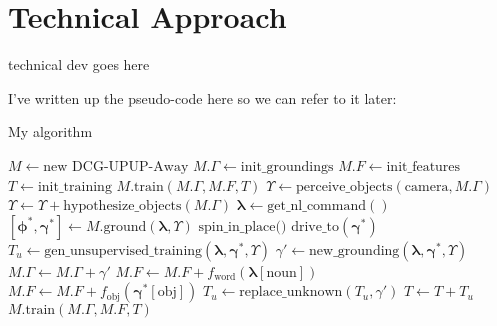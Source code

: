 \section{Technical Approach} \label{sec:technical}
technical dev goes here

I've written up the pseudo-code here so we can refer to it later:\\
\begin{algorithm}
\caption{My algorithm}\label{alg:dcg_upup_away}
\begin{algorithmic}[1]
\State $M \gets \text{new DCG-UPUP-Away}$
\State $M.\Gamma \gets \text{init\_groundings}$
\State $M.F \gets \text{init\_features}$
\State $T \gets \text{init\_training}$
\State $M.\text{train}(M.\Gamma, M.F, T)$
\State $\Upsilon \gets \text{perceive\_objects}(\text{camera},M.\Gamma)$
\State $\Upsilon \gets \Upsilon + \text{hypothesize\_objects}(M.\Gamma)$
\State $\boldsymbol{\lambda} \gets \text{get\_nl\_command}()$
\State $[\boldsymbol{\phi}^*,\boldsymbol{\gamma}^*] \gets M.\text{ground}(\boldsymbol{\lambda},\Upsilon)$
\State $\text{spin\_in\_place()}$
\Else
\State $\text{drive\_to}(\boldsymbol{\gamma}^*)$
\EndIf
\State $T_u \gets \text{gen\_unsupervised\_training}(\boldsymbol{\lambda},\boldsymbol{\gamma}^*,\Upsilon)$
\State $\gamma' \gets \text{new\_grounding}(\boldsymbol{\lambda},\boldsymbol{\gamma}^*,\Upsilon)$
\State $M.\Gamma \gets M.\Gamma + \gamma'$
\State $M.F \gets M.F + f_{\text{word}}(\boldsymbol{\lambda}[\text{noun}])$
\State $M.F \gets M.F + f_{\text{obj}}(\boldsymbol{\gamma}^*[\text{obj}])$
\State $T_u \gets \text{replace\_unknown}(T_u,\gamma')$
\EndIf
\State $T \gets T + T_u$
\State $M.\text{train}(M.\Gamma, M.F, T)$
\EndWhile
\EndProcedure
\end{algorithmic}
\end{algorithm}